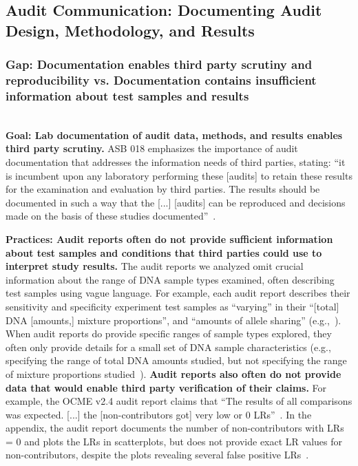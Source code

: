 \subsection{Audit Communication: Documenting Audit Design, Methodology, and Results} 
\label{sec:communication}


\subsubsection{Gap: Documentation enables third party scrutiny and reproducibility vs. Documentation contains insufficient information about test samples and results}
\label{sec:communication-design-gap}\textbf{ \\Goal: Lab documentation of audit data, methods, and results enables third party scrutiny.} 
ASB 018 emphasizes the importance of audit documentation that addresses the information needs of third parties, stating: ``it is incumbent upon any laboratory performing these [audits] to retain these results for the examination and evaluation by third parties. The results should be documented in such a way that the [...] [audits] can be reproduced and decisions made on the basis of these studies documented''~\cite[p.5]{asb018}.

\textbf{Practices: Audit reports often do not provide sufficient information about test samples and conditions that third parties could use to interpret study results.} The audit reports we analyzed omit crucial information about the range of DNA sample types examined, often describing test samples using vague language. For example, each audit report describes their sensitivity and specificity experiment test samples as ``varying'' in their ``[total] DNA [amounts,] mixture proportions'', and ``amounts of allele sharing'' (e.g.,~\cite[p.10]{pbsoIV}). When audit reports do provide specific ranges of sample types explored, they often only provide details for a small set of DNA sample characteristics (e.g., specifying the range of total DNA amounts studied, but not specifying the range of mixture proportions studied~\cite[p.15]{ocmeIV2.7}). \textbf{Audit reports also often do not provide data that would enable third party verification of their claims.} For example, the OCME v2.4 audit report claims that ``The results of all comparisons was expected. [...] the [non-contributors got] very low or 0 LRs''~\cite[p.22]{ocmeIV}. In the appendix, the audit report documents the number of non-contributors with LRs = 0 and plots the LRs in scatterplots, but does not provide exact LR values for non-contributors, despite the plots revealing several false positive LRs~\cite[p.47-50]{ocmeIV}.



